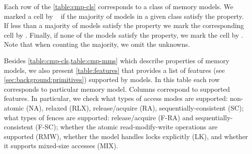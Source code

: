Each row of the \cref{table:cmp-cls} corresponds to a class of memory models.
We marked a cell by \cmark~ if the majority of models in a given class satisfy the property. 
If less than a majority of models satisfy the property we mark 
the corresponding cell by \wmark.
Finally, if none of the models satisfy the property, we mark the cell by \xmark. 
Note that when counting the majority, we omit the unknowns.  

Besides \cref{table:cmp-cls,table:cmp-mms} which describe 
properties of memory models, we also present \cref{table:features}
that provides a list of features (see \cref{sec:background:primitives}) 
supported by models.
In this table each row corresponds to particular memory model. 
Columns correspond to supported features. 
In particular, we check what types of access modes are supported:
non-atomic (NA), relaxed (RLX), release/acquire (RA), sequentially-consistent (SC); 
what types of fences are supported: release/acquire (F-RA) and sequentially-consistent (F-SC);
whether the atomic read-modify-write operations are supported (RMW),
whether the model handles locks explicitly (LK),
and whether it supports mixed-size accesses (MIX).

